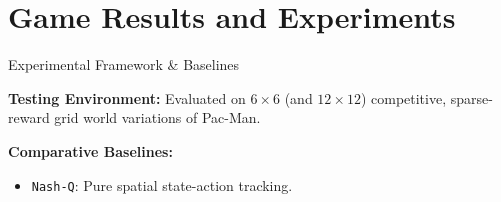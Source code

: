\documentclass[10pt, aspectratio=169]{beamer}
\begin{document}

\section{Game Results and Experiments}

\begin{frame}{Experimental Framework \& Baselines}
    
        \textbf{Testing Environment:} Evaluated on $6\times6$ (and $12\times12$) competitive, sparse-reward grid world variations of Pac-Man.
        
        \vspace{0.2cm}
        \textbf{Comparative Baselines:}
        \begin{itemize}
            \item \texttt{Nash-Q}: Pure spatial state-action tracking.
        \end{itemize}
\end{frame}
\end{document}
